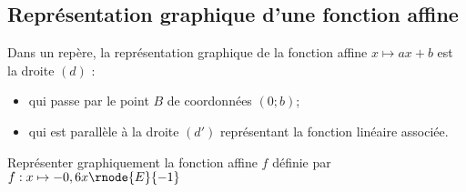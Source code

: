 \begin{changemargin}{0mm}{-10mm}
\section{Représentation graphique d'une fonction affine}
\begin{propriete}[\admise]
    Dans un repère, la représentation graphique de la fonction affine $x\mapsto ax+b$ est la droite $(d)$ :
    \begin{itemize}
        \item qui passe par le point $B$ de coordonnées $(0;b)$;
        \item qui est parallèle à la droite $(d')$ représentant la fonction linéaire associée.
    \end{itemize}
\end{propriete}
\begin{exemple*1}
    Représenter graphiquement la fonction affine $f$ définie par $f:x\mapsto-0,6x\rnode{E}{-1}$


\end{exemple*1}
\end{changemargin}
